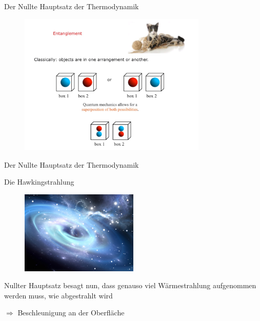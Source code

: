 \documentclass[ngerman,ph]{URbeamer}
\begin{document}
	\begin{frame}{Der Nullte Hauptsatz der Thermodynamik}	
		\begin{figure} [h] 
			\begin{center}
				\includegraphics[width=0.8\textwidth]{entanglement}
			\end{center}
		\end{figure} 	%
	\end{frame}
	\begin{frame}{Der Nullte Hauptsatz der Thermodynamik}
		\begin{center}
			\Large{Die Hawkingstrahlung} 
		\end{center}
		\begin{figure} [h] 
			\begin{center}
				\includegraphics[width=0.5\textwidth]{Hawkingstrahlung}
			\end{center}
		\end{figure} %
		\begin{block}{}
			Nullter Hauptsatz besagt nun, dass genauso viel Wärmestrahlung aufgenommen werden muss, wie abgestrahlt wird 
		
			$\Rightarrow$ Beschleunigung an der Oberfläche	
		\end{block}
	\end{frame}
	
\end{document}
